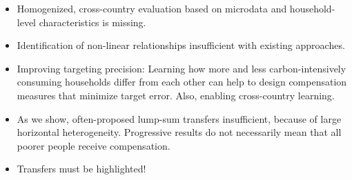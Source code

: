 \documentclass[12pt, a4paper]{article}
\begin{document}
\begin{itemize}
  \item Homogenized, cross-country evaluation based on microdata and household-level characteristics is missing.
  \item Identification of non-linear relationships insufficient with existing approaches.
  \item Improving targeting precision: Learning how more and less carbon-intensively consuming households differ from each other can help to design compensation measures that minimize target error. Also, enabling cross-country learning.
  \item As we show, often-proposed lump-sum transfers insufficient, because of large horizontal heterogeneity. Progressive results do not necessarily mean that all poorer people receive compensation.
  \item Transfers must be highlighted!


\end{itemize}
\end{document}
